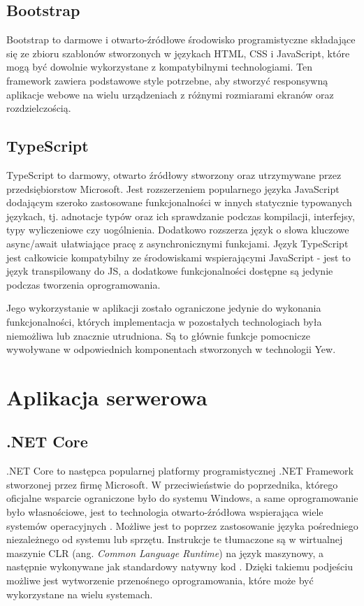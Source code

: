 \subsection*{Bootstrap}
Bootstrap to darmowe i otwarto-źródłowe środowisko programistyczne składające się
ze zbioru szablonów stworzonych w językach HTML, CSS i JavaScript, które mogą
być dowolnie wykorzystane z kompatybilnymi technologiami.
Ten framework zawiera podstawowe style potrzebne, aby stworzyć responsywną 
aplikacje webowe na wielu urządzeniach z różnymi rozmiarami ekranów oraz rozdzielczością. 

\subsection*{TypeScript}
TypeScript to darmowy, otwarto źródłowy stworzony oraz utrzymywane przez przedsiębiorstow Microsoft.
Jest rozszerzeniem popularnego języka JavaScript dodającym szeroko zastosowane funkcjonalności
w innych statycznie typowanych językach, tj. adnotacje typów oraz ich sprawdzanie
podczas kompilacji, interfejsy, typy wyliczeniowe czy uogólnienia.
Dodatkowo rozszerza język o słowa kluczowe async/await ułatwiające pracę
z asynchronicznymi funkcjami. Język TypeScript jest całkowicie kompatybilny ze 
środowiskami wspierającymi JavaScript - jest to język transpilowany do JS, a
dodatkowe funkcjonalności dostępne są jedynie podczas tworzenia oprogramowania.

Jego wykorzystanie w aplikacji zostało ograniczone jedynie do wykonania funkcjonalności,
których implementacja w pozostałych technologiach była niemożliwa lub znacznie 
utrudniona. Są to głównie funkcje pomocnicze wywoływane w odpowiednich komponentach
stworzonych w technologii Yew.

\section{Aplikacja serwerowa}

\subsection*{.NET Core}
.NET Core to następca popularnej platformy programistycznej .NET Framework stworzonej przez
firmę Microsoft. W przeciwieństwie do poprzednika, którego oficjalne wsparcie ograniczone było
do systemu Windows, a same oprogramowanie było własnościowe, jest to technologia otwarto-źródłowa
wspierająca wiele systemów operacyjnych \cite{price2021c}. Możliwe jest to poprzez zastosowanie
języka pośredniego niezależnego od systemu lub sprzętu. Instrukcje te tłumaczone są w 
wirtualnej maszynie CLR (ang. \textit{Common Language Runtime}) na język maszynowy, a
następnie wykonywane jak standardowy natywny kod \cite{msdn:clr}. Dzięki takiemu podjeściu
możliwe jest wytworzenie przenośnego oprogramowania, które może być wykorzystane na wielu
systemach.

